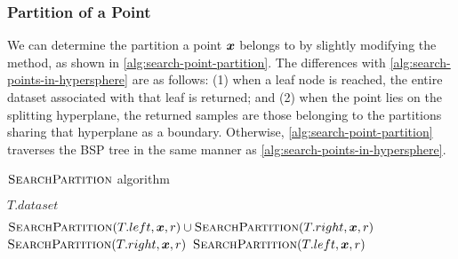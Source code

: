 \subsubsection{Partition of a Point}
\label{subsub:point-partition}

We can determine the partition a point $\bm{x}$ belongs to by slightly modifying the  method, as shown in \autoref{alg:search-point-partition}. The differences with \autoref{alg:search-points-in-hypersphere} are as follows: (1) when a leaf node is reached, the entire dataset associated with that leaf is returned; and (2) when the point lies on the splitting hyperplane, the returned samples are those belonging to the partitions sharing that hyperplane as a boundary. Otherwise, \autoref{alg:search-point-partition} traverses the BSP tree in the same manner as \autoref{alg:search-points-in-hypersphere}.

\begin{algorithm}[t]
	\caption[$\algtitle{SearchPartition}$ algorithm]{$\algtitle{SearchPartition}$ algorithm}
	\label{alg:search-point-partition}
	\begin{algorithmic}[1]

      \State \Return $T.dataset$
    \EndIf

      \State \Return $\textsc{SearchPartition}(T.left,\bm{x},r) \cup \textsc{SearchPartition}(T.right,\bm{x}, r)$
      \State \Return $\textsc{SearchPartition}(T.right,\bm{x},r)$
    \Else
      \State \Return $\textsc{SearchPartition}(T.left,\bm{x},r)$
    \EndIf
	\end{algorithmic}
\end{algorithm}


